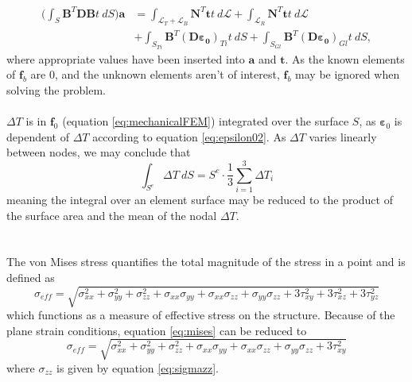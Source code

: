 \documentclass[a4paper,11pt]{article}
\begin{document}
\begin{align}
    \bigg( \int_S \boldsymbol{B}^T\boldsymbol{DB} t \: dS \bigg) \boldsymbol{a} &= \int_{\mathcal{L}_T + \mathcal{L}_B} \boldsymbol{N}^T \boldsymbol{t} t \: d\mathcal{L} + \int_{\mathcal{L}_R} \boldsymbol{N}^T \boldsymbol{t} t \: d\mathcal{L} \nonumber \\
    &+ \int_{S_{Ti}} \boldsymbol{B}^T (\boldsymbol{D \varepsilon_0})_{Ti} t \: dS + \int_{S_{Gl}} \boldsymbol{B}^T (\boldsymbol{D \varepsilon_0})_{Gl} t \: dS,
\end{align}
where appropriate values have been inserted into $\boldsymbol{a}$ and $\boldsymbol{t}$. As the known elements of $\boldsymbol{f}_b$ are 0, and the unknown elements aren't of interest, $\boldsymbol{f}_b$ may be ignored when solving the problem.\\
\\$\Delta T$ is in $\boldsymbol{f}_0$ (equation \ref{eq:mechanicalFEM}) integrated over the surface $S$, as $\boldsymbol{\varepsilon}_0$ is dependent of $\Delta T$ according to equation \ref{eq:epsilon02}. As $\Delta T$ varies linearly between nodes, we may conclude that
\begin{equation}\label{eq:meanT}
    \int_{S^e} \Delta T \: dS = S^e \cdot \frac{1}{3} \sum^3_{i=1} \Delta T_i
\end{equation}
meaning the integral over an element surface may be reduced to the product of the surface area and the mean of the nodal $\Delta T$.\\
\\\\The von Mises stress quantifies the total magnitude of the stress in a point and is defined as
\begin{equation}\label{eq:mises}
    \sigma_{eff} = \sqrt{\sigma_{xx}^2 + \sigma_{yy}^2 + \sigma_{zz}^2 + \sigma_{xx} \sigma_{yy} + \sigma_{xx} \sigma_{zz} + \sigma_{yy} \sigma_{zz} + 3 \tau_{xy}^2 + 3 \tau_{xz}^2 + 3 \tau_{yz}^2}
\end{equation}
which functions as a measure of effective stress on the structure. Because of the plane strain conditions, equation \ref{eq:mises} can be reduced to
\begin{equation}
    \sigma_{eff} = \sqrt{\sigma_{xx}^2 + \sigma_{yy}^2 + \sigma_{zz}^2 + \sigma_{xx} \sigma_{yy} + \sigma_{xx} \sigma_{zz} + \sigma_{yy} \sigma_{zz} + 3 \tau_{xy}^2}
\end{equation}
where $\sigma_{zz}$ is given by equation \ref{eq:sigmazz}.
\end{document}
